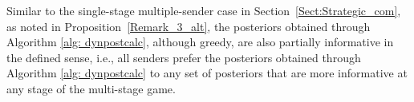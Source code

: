 \documentclass[12pt,journal,onecolumn]{IEEEtran}
\newtheorem{remark}{Remark}
\newcommand{\rknote}[1]{\noindent{\leavevmode\color{red}[Raj -- #1]}}
\newcommand{\mbnote}[1]{\noindent{\leavevmode\color{blue}[Melih -- #1]}}
\begin{document}

Similar to the single-stage multiple-sender case in Section~\ref{Sect:Strategic_com}, as noted in Proposition~\ref{Remark_3_alt}, the posteriors obtained through Algorithm \ref{alg: dynpostcalc}, although greedy, are also partially informative in the defined sense, i.e., all senders prefer the posteriors obtained through Algorithm \ref{alg: dynpostcalc} to any set of posteriors that are more informative at any stage of the multi-stage game.


\end{document}
